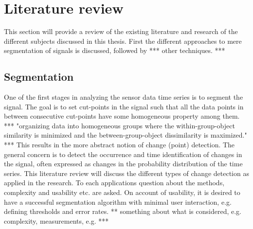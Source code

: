 




\section{Literature review}
This section will provide a review of the existing literature and research of the different subjects discussed in this thesis.
First the different approaches to mere segmentation of signals is discussed, followed by *** other techniques. ***

\subsection{Segmentation}
One of the first stages in analyzing the sensor data time series is to segment the signal.
The goal is to set cut-points in the signal such that all the data points in between consecutive cut-points have some homogeneous property among them. *** "organizing data into homogeneous groups where the within-group-object similarity is minimized and the between-group-object dissimilarity is maximized." ***
This results in the more abstract notion of change (point) detection.
The general concern is to detect the occurrence and time identification of changes in the signal, often expressed as changes in the probability distribution of the time series.
This literature review will discuss the different types of change detection as applied in the research.
To each applications question about the methods, complexity and usability etc. are asked.
On account of usability, it is desired to have a successful segmentation algorithm with minimal user interaction, e.g. defining thresholds and error rates.
** something about what is considered, e.g. complexity, measurements, e.g. ***

